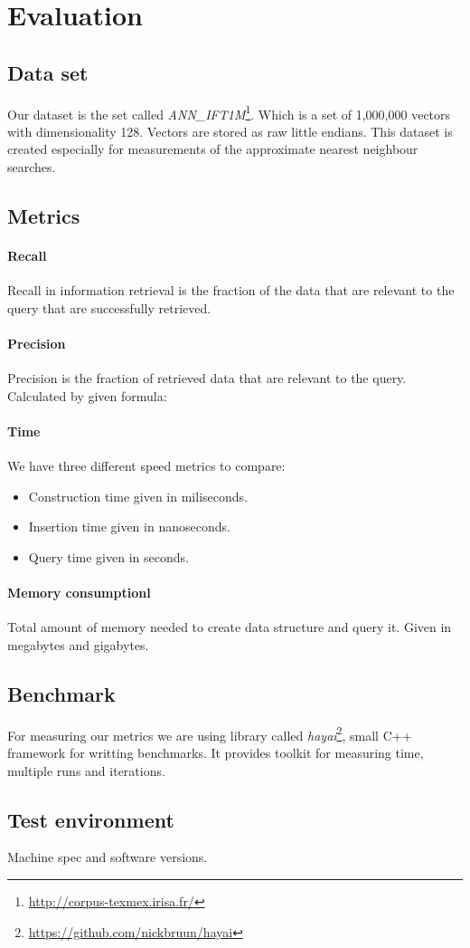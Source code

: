 \section{Evaluation}
 \subsection{Data set}
 Our dataset is the set called \textit{ANN\_IFT1M}\footnote{\url{http://corpus-texmex.irisa.fr/}}. Which is a set of 1,000,000 vectors
 with dimensionality 128. Vectors are stored as raw little endians.
 This dataset is created especially for measurements of the approximate nearest 
neighbour searches.  
 \subsection{Metrics}
 \paragraph{Recall} Recall in information retrieval is the fraction of the data that are relevant to the query that are successfully retrieved.
 \paragraph{Precision} Precision is the fraction of retrieved data that are relevant to the query. Calculated by given formula:
 \paragraph{Time} We have three different speed metrics to compare:
 \begin{itemize}
  \item Construction time given in miliseconds. 
  \item Insertion time given in nanoseconds.
  \item Query time given in seconds.
\end{itemize}
 \paragraph{Memory consumptionl} Total amount of memory needed to create data structure and query it. Given in megabytes and gigabytes.
 \subsection{Benchmark} For measuring our metrics we are using library called 
 \textit{hayai}\footnote{\url{https://github.com/nickbruun/hayai}}, small C++ framework for writting benchmarks. It provides toolkit for measuring time, multiple runs and iterations.
  \subsection{Test environment} 
  Machine spec and software versions. 
\label{evaluation}
